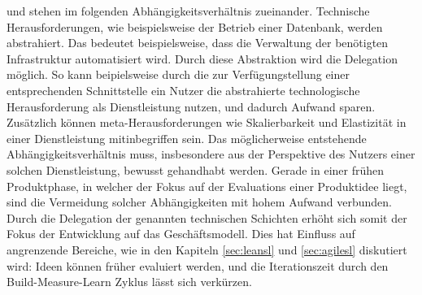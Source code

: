 \noindent und stehen im folgenden Abhängigkeitsverhältnis zueinander. Technische Herausforderungen, wie beispielsweise der Betrieb einer Datenbank, werden abstrahiert. Das bedeutet beispielsweise, dass die Verwaltung der benötigten Infrastruktur automatisiert wird. Durch diese Abstraktion wird die Delegation möglich. So kann beipielsweise durch die zur Verfügungstellung einer entsprechenden Schnittstelle ein Nutzer die abstrahierte technologische Herausforderung als Dienstleistung nutzen, und dadurch Aufwand sparen. Zusätzlich können meta-Herausforderungen wie Skalierbarkeit und Elastizität in einer Dienstleistung mitinbegriffen sein. Das möglicherweise entstehende Abhängigkeitsverhältnis muss, insbesondere aus der Perspektive des Nutzers einer solchen Dienstleistung, bewusst gehandhabt werden. Gerade in einer frühen Produktphase, in welcher der Fokus auf der Evaluations einer Produktidee liegt, sind die Vermeidung solcher Abhängigkeiten mit hohem Aufwand verbunden. Durch die Delegation der genannten technischen Schichten erhöht sich somit der Fokus der Entwicklung auf das Geschäftsmodell. Dies hat Einfluss auf angrenzende Bereiche, wie in den Kapiteln \ref{sec:leansl} und \ref{sec:agilesl} diskutiert wird: Ideen können früher evaluiert werden, und die Iterationszeit durch den Build-Measure-Learn Zyklus lässt sich verkürzen.